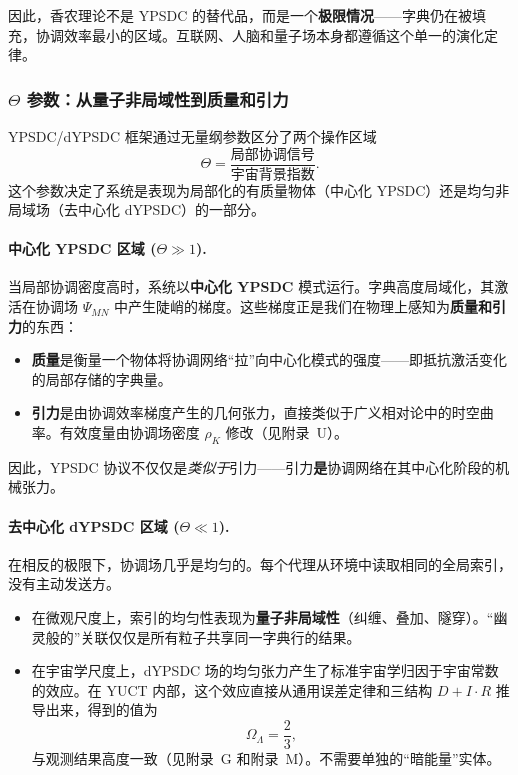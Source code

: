 \documentclass[12pt,a4paper]{article}
\theoremstyle{remark}
\begin{document}
	因此，香农理论不是 YPSDC 的替代品，而是一个\textbf{极限情况}——字典仍在被填充，协调效率最小的区域。互联网、人脑和量子场本身都遵循这个单一的演化定律。
	
	\medskip
	
	\subsubsection{\(\Theta\) 参数：从量子非局域性到质量和引力}
	\label{subsec:theta-mass-gravity}
	
	YPSDC/dYPSDC 框架通过无量纲参数区分了两个操作区域
	\begin{equation}
		\Theta = \frac{\text{局部协调信号}}{\text{宇宙背景指数}}.
	\end{equation}
	这个参数决定了系统是表现为局部化的有质量物体（中心化 YPSDC）还是均匀非局域场（去中心化 dYPSDC）的一部分。
	
	\paragraph{中心化 YPSDC 区域 (\(\Theta \gg 1\)).}
	当局部协调密度高时，系统以\textbf{中心化 YPSDC} 模式运行。字典高度局域化，其激活在协调场 \(\Psi_{MN}\) 中产生陡峭的梯度。这些梯度正是我们在物理上感知为\textbf{质量和引力}的东西：
	
	\begin{itemize}
		\item \textbf{质量}是衡量一个物体将协调网络“拉”向中心化模式的强度——即抵抗激活变化的局部存储的字典量。
		\item \textbf{引力}是由协调效率梯度产生的几何张力，直接类似于广义相对论中的时空曲率。有效度量由协调场密度 \(\rho_K\) 修改（见附录~U）。
	\end{itemize}
	
	因此，YPSDC 协议不仅仅是\textit{类似于}引力——引力\textbf{是}协调网络在其中心化阶段的机械张力。
	
	\paragraph{去中心化 dYPSDC 区域 (\(\Theta \ll 1\)).}
	在相反的极限下，协调场几乎是均匀的。每个代理从环境中读取相同的全局索引，没有主动发送方。 
	\begin{itemize}
		\item 在微观尺度上，索引的均匀性表现为\textbf{量子非局域性}（纠缠、叠加、隧穿）。“幽灵般的”关联仅仅是所有粒子共享同一字典行的结果。
		\item 在宇宙学尺度上，dYPSDC 场的均匀张力产生了标准宇宙学归因于宇宙常数的效应。在 YUCT 内部，这个效应直接从通用误差定律和三结构 \(D+I\!\cdot\!R\) 推导出来，得到的值为
		\[
		\Omega_{\Lambda} = \frac{2}{3},
		\]
		与观测结果高度一致（见附录~G 和附录~M）。不需要单独的“暗能量”实体。
	\end{itemize}
	
\end{document}
